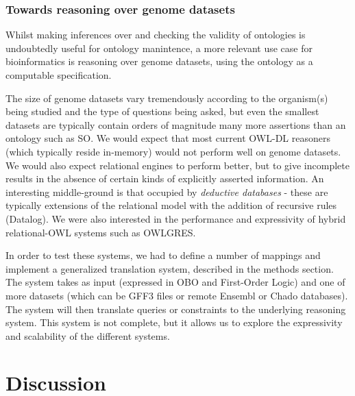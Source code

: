 \documentclass{article}
\def\SOGI{\pr{SO$^{+}$}}
\def\mRNA{\pr{mRNA}}
\def\polyAsequence{\pr{polyA\_sequence}}
\begin{document}


\subsubsection{Towards reasoning over genome datasets}


Whilst making inferences over and checking the validity of ontologies
is undoubtedly useful for ontology manintence, a more relevant use
case for bioinformatics is reasoning over genome datasets, using the
ontology as a computable specification.

The size of genome datasets vary tremendously according to the
organism(s) being studied and the type of questions being asked, but
even the smallest datasets are typically contain orders of magnitude
many more assertions than an ontology such as SO. We would expect that
most current OWL-DL reasoners (which typically reside in-memory) would
not perform well on genome datasets. We would also expect relational
engines to perform better, but to give incomplete results in the
absence of certain kinds of explicitly asserted information. An
interesting middle-ground is that occupied by \emph{deductive
  databases} - these are typically extensions of the relational model
with the addition of recursive rules (Datalog). We were also
interested in the performance and expressivity of hybrid
relational-OWL systems such as OWLGRES.

In order to test these systems, we had to define a number of mappings
and implement a generalized translation system, described in the
methods section. The system takes as input \SOGI (expressed in OBO and
First-Order Logic) and one of more datasets (which can be GFF3 files
or remote Ensembl or Chado databases). The system will then translate
queries or constraints to the underlying reasoning system. This system
is not complete, but it allows us to explore the expressivity and
scalability of the different systems.


\section{Discussion}
\end{document}
